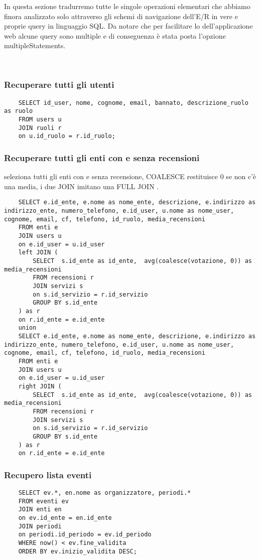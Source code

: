 In questa sezione tradurremo tutte le singole operazioni elementari che abbiamo finora analizzato solo
attraverso gli schemi di navigazione dell’E/R in vere e proprie query in linguaggio SQL. 
Da notare che per facilitare lo dell'applicazione web alcune query sono multiple e di conseguenza è stata posta l'opzione multipleStatements.

\\
\subsubsection{Recuperare tutti gli utenti}
\begin{lstlisting}
    SELECT id_user, nome, cognome, email, bannato, descrizione_ruolo as ruolo
    FROM users u
    JOIN ruoli r 
    on u.id_ruolo = r.id_ruolo;
\end{lstlisting}

\subsubsection{Recuperare tutti gli enti con e senza recensioni}
seleziona tutti gli enti con e senza recensione, COALESCE restituisce 0 se non c'è una media, i due JOIN imitano una FULL JOIN .
\begin{lstlisting}
    SELECT e.id_ente, e.nome as nome_ente, descrizione, e.indirizzo as indirizzo_ente, numero_telefono, e.id_user, u.nome as nome_user, cognome, email, cf, telefono, id_ruolo, media_recensioni
    FROM enti e
    JOIN users u
    on e.id_user = u.id_user
    left JOIN (
        SELECT  s.id_ente as id_ente,  avg(coalesce(votazione, 0)) as media_recensioni
        FROM recensioni r
        JOIN servizi s
        on s.id_servizio = r.id_servizio
        GROUP BY s.id_ente
    ) as r
    on r.id_ente = e.id_ente 
    union
    SELECT e.id_ente, e.nome as nome_ente, descrizione, e.indirizzo as indirizzo_ente, numero_telefono, e.id_user, u.nome as nome_user, cognome, email, cf, telefono, id_ruolo, media_recensioni
    FROM enti e
    JOIN users u
    on e.id_user = u.id_user
    right JOIN (
        SELECT  s.id_ente as id_ente,  avg(coalesce(votazione, 0)) as media_recensioni
        FROM recensioni r
        JOIN servizi s
        on s.id_servizio = r.id_servizio
        GROUP BY s.id_ente
    ) as r
    on r.id_ente = e.id_ente
\end{lstlisting}


\subsubsection{Recupero lista eventi}
\begin{lstlisting}
    SELECT ev.*, en.nome as organizzatore, periodi.*
    FROM eventi ev
    JOIN enti en
    on ev.id_ente = en.id_ente
    JOIN periodi
    on periodi.id_periodo = ev.id_periodo
    WHERE now() < ev.fine_validita
    ORDER BY ev.inizio_validita DESC;
\end{lstlisting}

